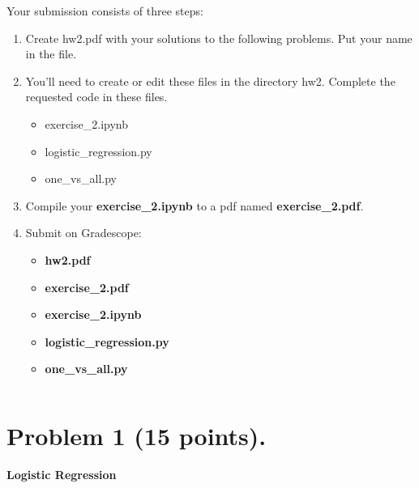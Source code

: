 \documentclass{article}
\begin{document}
{\noindent} Your  submission  consists  of  three  steps:
\begin{enumerate}

\item  Create hw2.pdf with your solutions to the following problems.  
Put your name in the file.

\item    You’ll need to create or edit these files in the directory hw2. Complete the requested code in these files.

\begin{itemize}
\item exercise\_2.ipynb

\item logistic\_regression.py

\item one\_vs\_all.py

\end{itemize}

\item Compile your \textbf{exercise\_2.ipynb} to a pdf named \textbf{exercise\_2.pdf}.

\item Submit on Gradescope:

\begin{itemize}

\item \textbf{hw2.pdf}

\item \textbf{exercise\_2.pdf}

\item \textbf{exercise\_2.ipynb}

\item \textbf{logistic\_regression.py}

\item \textbf{one\_vs\_all.py}

\end{itemize}

\begin{verbatim}

\end{verbatim}

\end{enumerate}

\newpage

\section*{Problem 1 (15 points).} {\bf Logistic Regression}
\end{document}
